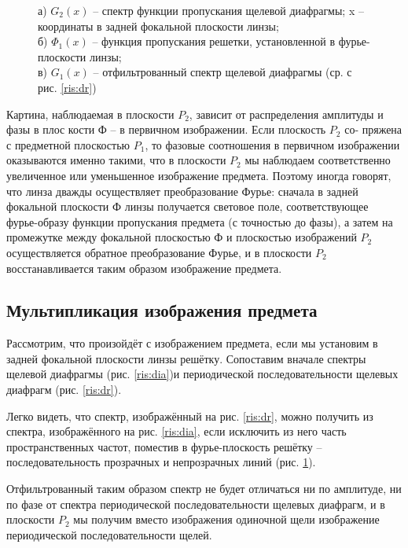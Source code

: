 \documentclass[a5paper,10pt, twoside]{article} %
\begin{document}
\begin{figure}[h]
\begin{minipage}[h]{0.65\linewidth}
		    \end{minipage}
			\caption
			{
				а) $G_2 (x)$ -- спектр функции пропускания щелевой диафрагмы; x -- координаты в задней фокальной плоскости линзы; \\
				б) $\Phi_1 (x)$ -- функция пропускания решетки, установленной в фурье-плоскости линзы;\\
				в) $G_1 (x)$ -- отфильтрованный спектр щелевой диафрагмы (ср. с рис. \ref{ris:dr})
			}
			\label{ris:three}
		\end{figure}
		
		Картина, наблюдаемая в плоскости $P_2$, зависит от распределения амплитуды и фазы в плос кости	Ф -- в первичном изображении. Если плоскость $P_2$ со-
		пряжена с предметной плоскостью	$P_1$, то фазовые соотношения в первичном изображении оказываются именно такими, что в плоскости $P_2$ мы наблюдаем соответственно увеличенное или уменьшенное изображение предмета. Поэтому иногда говорят, что линза дважды осуществляет преобразование Фурье: сначала в задней фокальной плоскости Ф линзы получается световое
		поле, соответствующее фурье-образу функции пропускания предмета (с точностью до фазы),	а затем на промежутке между фокальной плоскостью Ф и плоскостью изображений $P_2$ осуществляется обратное преобразование Фурье, и в плоскости $P_2$ восстанавливается таким образом	изображение предмета.
		
		
	\subsection{Мультипликация изображения предмета}
	
		Рассмотрим, что произойдёт с изображением предмета, если мы	установим в задней фокальной плоскости линзы решётку. Сопоставим вначале спектры щелевой диафрагмы (рис. \ref{ris:dia})и периодической последовательности щелевых диафрагм (рис. \ref{ris:dr}).
		
		Легко видеть, что спектр, изображённый на рис. \ref{ris:dr}, можно получить из спектра, изображённого на рис. \ref{ris:dia}, если исключить из него часть пространственных частот, поместив в фурье-плоскость решётку -- последовательность прозрачных и непрозрачных линий (рис. \ref{ris:three}).
		
		Отфильтрованный таким образом спектр не будет отличаться ни по амплитуде, ни по фазе от спектра периодической последовательности щелевых диафрагм, и в плоскости $P_2$ мы получим вместо изображения одиночной щели изображение периодической последовательности щелей.
		
\end{document}
